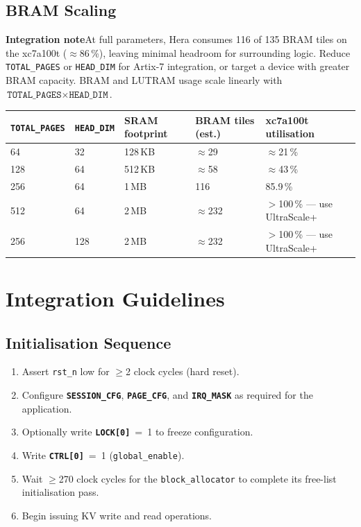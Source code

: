 \documentclass[10pt, a4paper]{article}
\newcommand{\reg}[1]{\texttt{\textbf{#1}}}
\newcommand{\field}[1]{\texttt{#1}}
\newcommand{\portname}[1]{\texttt{#1}}
\newcommand{\param}[1]{\texttt{#1}}
\newcommand{\notebox}[2][Note]{%
  \vspace{4pt}
  \noindent
  \setlength{\fboxsep}{7pt}
  \setlength{\fboxrule}{0pt}
  \colorbox{heralight}{%
    \parbox{\dimexpr\linewidth-2\fboxsep}{%
      \small\color{heradark}%
      \textbf{\color{heraviolet}#1\enspace}\ignorespaces#2%
    }%
  }%
  \vspace{4pt}%
}
\begin{document}
\subsection{BRAM Scaling}

\notebox[Integration note]{At full parameters, Hera consumes 116 of 135 BRAM
tiles on the xc7a100t ($\approx$86\,\%), leaving minimal headroom for
surrounding logic. Reduce \param{TOTAL\_PAGES} or \param{HEAD\_DIM} for
Artix-7 integration, or target a device with greater BRAM capacity.
BRAM and LUTRAM usage scale linearly with
$\param{TOTAL\_PAGES} \times \param{HEAD\_DIM}$.}

\renewcommand{\arraystretch}{1.3}
\begin{tabularx}{\linewidth}{C{2.5cm} C{2.2cm} C{2.6cm} C{2.4cm} C{3.5cm}}
\toprule
\param{TOTAL\_PAGES} & \param{HEAD\_DIM} & SRAM footprint & BRAM tiles (est.) & xc7a100t utilisation \\
\midrule
{} 64  & 32 & 128\,KB & $\approx$29  & $\approx$21\,\% \\
                 128  & 64 & 512\,KB & $\approx$58  & $\approx$43\,\% \\
 256 & 64 &   1\,MB &         116  &         85.9\,\% \\
                  512 & 64 &   2\,MB & $\approx$232 & $>$100\,\% — use UltraScale+ \\
 256 & 128&   2\,MB & $\approx$232 & $>$100\,\% — use UltraScale+ \\
\bottomrule
\end{tabularx}

\section{Integration Guidelines}

\subsection{Initialisation Sequence}

\begin{enumerate}
  \item Assert \portname{rst\_n} low for $\geq$2 clock cycles (hard reset).
  \item Configure \reg{SESSION\_CFG}, \reg{PAGE\_CFG}, and \reg{IRQ\_MASK}
        as required for the application.
  \item Optionally write \reg{LOCK[0]}~=~1 to freeze configuration.
  \item Write \reg{CTRL[0]}~=~1 (\field{global\_enable}).
  \item Wait $\geq$270 clock cycles for the \texttt{block\_allocator}
        to complete its free-list initialisation pass.
  \item Begin issuing KV write and read operations.
\end{enumerate}
\end{document}
